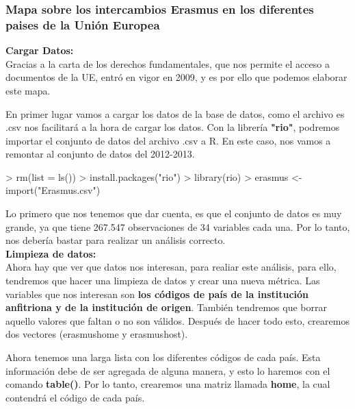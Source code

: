 \documentclass [a4paper] {article}
\begin{document}
\subsubsection{Mapa sobre los intercambios Erasmus en los diferentes paises de la Unión Europea}
\textbf{Cargar Datos:}\\
Gracias a la carta de los derechos fundamentales, que nos permite el acceso a documentos de la
UE, entró en vigor en 2009, y es por ello que podemos elaborar este mapa.

En primer lugar vamos a cargar los datos de la base de datos, como el archivo es .csv nos 
facilitará a la hora de cargar los datos. Con la librería \textbf{"rio"}, podremos 
importar el conjunto de datos del archivo .csv a R. En este caso, nos vamos a remontar al
conjunto de datos del 2012-2013.

\begin{Schunk}
\begin{Sinput}
> rm(list = ls())
> install.packages("rio")
> library(rio) 
> erasmus <- import("Erasmus.csv") 
\end{Sinput}
\end{Schunk}

Lo primero que nos tenemos que dar cuenta, es que el conjunto de datos es muy grande, ya que
tiene 267.547 observaciones de 34 variables cada una. Por lo tanto, nos debería bastar para
realizar un análisis correcto.\\

\textbf{Limpieza de datos:}\\
Ahora hay que ver que datos nos interesan, para realiar este análisis, para ello, tendremos que
hacer una limpieza de datos y crear una nueva métrica. Las variables que nos interesan son 
\textbf{los códigos de país de la institución anfitriona y de la institución de origen}.
También tendremos que borrar aquello valores que faltan o no son válidos. Después de hacer
todo esto, crearemos dos vectores (erasmushome y erasmushost).

\begin{Schunk}
\end{Schunk}

Ahora tenemos una larga lista con los diferentes códigos de cada país. Esta información debe de
ser agregada de alguna manera, y esto lo haremos con el comando \textbf{table()}. Por lo tanto,
crearemos una matriz llamada \textbf{home}, la cual contendrá el código de cada país.
\end{document}
